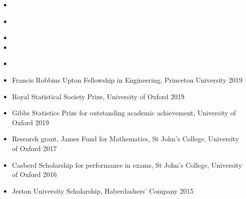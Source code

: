 \documentclass[
  date,
  number,
]{wgu-cv}
\begin{document}

\begin{itemize}
	\item {}
\end{itemize}

\begin{itemize}
\item {}
\end{itemize}

\begin{itemize}
  \item {}
  \item {}
\end{itemize}


\begin{itemize}
  \item {}
\end{itemize}


\pagebreak

\begin{itemize}
  \item Francis Robbins Upton Fellowship in Engineering,
    Princeton University
    \hfill 2019%
  \item Royal Statistical Society Prize,
    University of Oxford
    \hfill 2019%
  \item Gibbs Statistics Prize for outstanding academic achievement,
    University of Oxford
    \hfill 2019%
	\item Research grant, James Fund for Mathematics,
    St John's College, University of Oxford
    \hfill 2017%
	\item Casberd Scholarship for performance in exams,
    St John's College, University of Oxford
    \hfill 2016%
  \item Jeston University Scholarship,
    Haberdashers' Company
    \hfill 2015%
\end{itemize}



\end{document}
